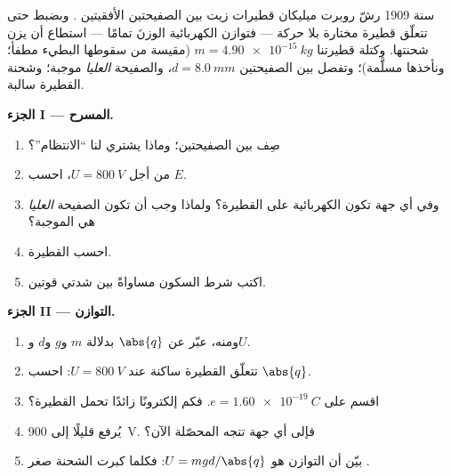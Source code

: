 \begin{problem}
\label{pb:g11:electric-gravitational-fields:1}
سنة 1909 رشّ روبرت ميليكان قطيرات زيت بين الصفيحتين
الأفقيتين . وبضبط  حتى تتعلّق قطيرة مختارة
بلا حركة --- فتوازن  الكهربائية الوزنَ تمامًا --- استطاع
أن يزن شحنتها. وكتلة قطيرتنا $m = \qty{4.90e-15}{kg}$
(مقيسة من سقوطها البطيء  مطفأ؛ ونأخذها مسلَّمة)؛
وتفصل بين الصفيحتين $d = \qty{8.0}{mm}$، والصفيحة \emph{العليا}
موجبة؛ وشحنة القطيرة سالبة.

\medskip
\noindent\textbf{الجزء I --- المسرح.}
\begin{enumerate}
  \item صِف  بين الصفيحتين؛ وماذا يشتري لنا ``الانتظام''؟
  \item من أجل $U = \qty{800}{V}$، احسب $E$.
  \item وفي أي جهة تكون  الكهربائية على القطيرة؟ ولماذا وجب أن تكون
        الصفيحة \emph{العليا} هي الموجبة؟
  \item احسب  القطيرة.
  \item اكتب شرط السكون مساواةً بين شدتي
        قوتين.
\end{enumerate}

\medskip
\noindent\textbf{الجزء II --- التوازن.}
\begin{enumerate}[resume]
  \item ومنه، عبّر عن $\abs{q}$ بدلالة $m$ و$g$ و$d$ و$U$.
  \item تتعلّق القطيرة ساكنة عند $U = \qty{800}{V}$: احسب
        $\abs{q}$.
  \item اقسم على $e = \qty{1.60e-19}{C}$. فكم إلكترونًا زائدًا
        تحمل القطيرة؟
  \item يُرفع  قليلًا إلى \qty{900}{V}. فإلى أي جهة تتجه
         المحصّلة الآن؟
  \item بيّن أن  التوازن هو $U = mgd/\abs{q}$: فكلما كبرت
        الشحنة صغر .
\end{enumerate}


\end{problem}
